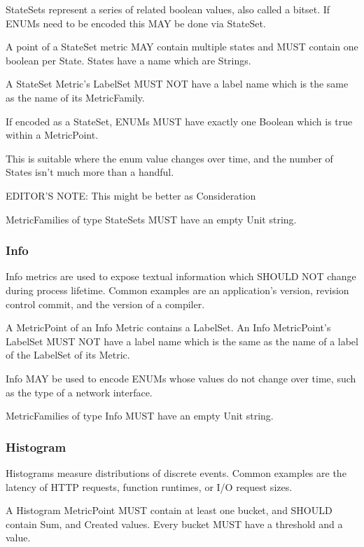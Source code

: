 \documentclass[a4paper,12pt,notitlepage,twoside,openright]{article}
\begin{document}
StateSets represent a series of related boolean values, also called a
bitset. If ENUMs need to be encoded this MAY be done via StateSet.

A point of a StateSet metric MAY contain multiple states and MUST
contain one boolean per State. States have a name which are Strings.

A StateSet Metric's LabelSet MUST NOT have a label name which is the
same as the name of its MetricFamily.

If encoded as a StateSet, ENUMs MUST have exactly one Boolean which is
true within a MetricPoint.

This is suitable where the enum value changes over time, and the number
of States isn't much more than a handful.

EDITOR'S NOTE: This might be better as Consideration

MetricFamilies of type StateSets MUST have an empty Unit string.

\hypertarget{info}{%
\subsubsection{Info}\label{info}}

Info metrics are used to expose textual information which SHOULD NOT
change during process lifetime. Common examples are an application's
version, revision control commit, and the version of a compiler.

A MetricPoint of an Info Metric contains a LabelSet. An Info
MetricPoint's LabelSet MUST NOT have a label name which is the same as
the name of a label of the LabelSet of its Metric.

Info MAY be used to encode ENUMs whose values do not change over time,
such as the type of a network interface.

MetricFamilies of type Info MUST have an empty Unit string.

\hypertarget{histogram}{%
\subsubsection{Histogram}\label{histogram}}

Histograms measure distributions of discrete events. Common examples are
the latency of HTTP requests, function runtimes, or I/O request sizes.

A Histogram MetricPoint MUST contain at least one bucket, and SHOULD
contain Sum, and Created values. Every bucket MUST have a threshold and
a value.
\end{document}
